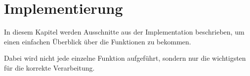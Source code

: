 \chapter{Implementierung}
In diesem Kapitel werden Ausschnitte aus der Implementation beschrieben, um einen einfachen Überblick über die Funktionen zu bekommen.

Dabei wird nicht jede einzelne Funktion aufgeführt, sondern nur die wichtigsten für die korrekte Verarbeitung.



